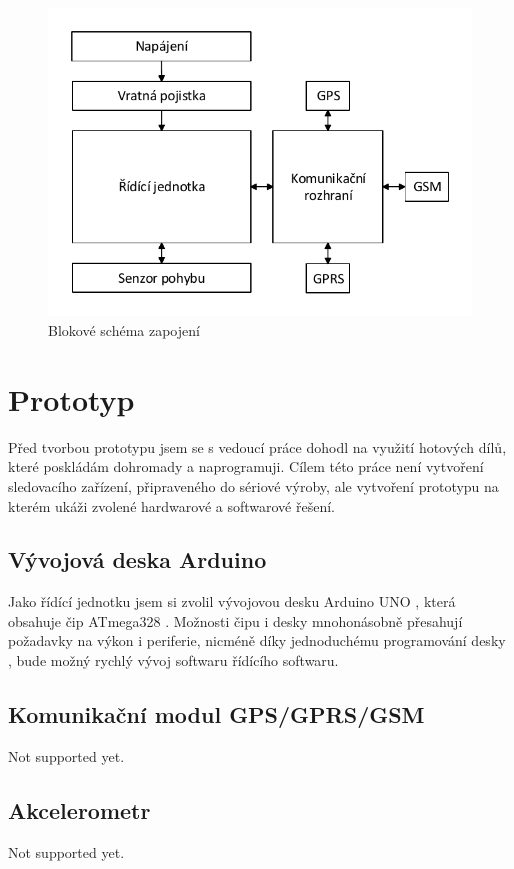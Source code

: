 \documentclass[FM,BP]{tulthesis}  %
\begin{document}
\begin{figure}[H]
\includegraphics[width=\textwidth]{graphs/schema_blokove.pdf}
\caption{Blokové schéma zapojení}
\label{foto}
\end{figure}


\chapter{Prototyp}
Před tvorbou prototypu jsem se s vedoucí práce dohodl na využití hotových dílů, které poskládám dohromady a naprogramuji. Cílem této práce není vytvoření sledovacího zařízení, připraveného do sériové výroby, ale vytvoření prototypu na kterém ukáži zvolené hardwarové a softwarové řešení.

\section{Vývojová deska Arduino}
Jako řídící jednotku jsem si zvolil vývojovou desku Arduino UNO \cite{Arduino Schematic}, která obsahuje čip ATmega328 \cite{Atmega datasheet}. Možnosti čipu i desky mnohonásobně přesahují požadavky na výkon i periferie, nicméně díky jednoduchému programování desky \cite{Pruvodce arduinem}, bude možný rychlý vývoj softwaru řídícího softwaru.

\section{Komunikační modul GPS/GPRS/GSM}
Not supported yet.

\section{Akcelerometr}
Not supported yet.
\end{document}
